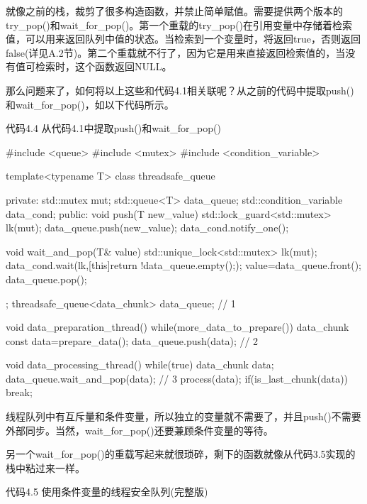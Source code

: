 就像之前的栈，裁剪了很多构造函数，并禁止简单赋值。需要提供两个版本的try\_pop()和wait\_for\_pop()。第一个重载的try\_pop()在引用变量中存储着检索值，可以用来返回队列中值的状态。当检索到一个变量时，将返回true，否则返回false(详见A.2节)。第二个重载就不行了，因为它是用来直接返回检索值的，当没有值可检索时，这个函数返回NULL。

那么问题来了，如何将以上这些和代码4.1相关联呢？从之前的代码中提取push()和wait\_for\_pop()，如以下代码所示。

代码4.4 从代码4.1中提取push()和wait\_for\_pop()

\begin{cpp}
#include <queue>
#include <mutex>
#include <condition_variable>

template<typename T>
class threadsafe_queue
{
private:
  std::mutex mut;
  std::queue<T> data_queue;
  std::condition_variable data_cond;
public:
  void push(T new_value)
  {
    std::lock_guard<std::mutex> lk(mut);
    data_queue.push(new_value);
    data_cond.notify_one();
  }

  void wait_and_pop(T& value)
  {
    std::unique_lock<std::mutex> lk(mut);
    data_cond.wait(lk,[this]{return !data_queue.empty();});
    value=data_queue.front();
    data_queue.pop();
  }
};
threadsafe_queue<data_chunk> data_queue;  // 1

void data_preparation_thread()
{
  while(more_data_to_prepare())
  {
    data_chunk const data=prepare_data();
    data_queue.push(data);  // 2
  }
}

void data_processing_thread()
{
  while(true)
  {
    data_chunk data;
    data_queue.wait_and_pop(data);  // 3
    process(data);
    if(is_last_chunk(data))
      break;
  }
}
\end{cpp}

线程队列中有互斥量和条件变量，所以独立的变量就不需要了，并且push()不需要外部同步。当然，wait\_for\_pop()还要兼顾条件变量的等待。

另一个wait\_for\_pop()的重载写起来就很琐碎，剩下的函数就像从代码3.5实现的栈中粘过来一样。

代码4.5 使用条件变量的线程安全队列(完整版)

